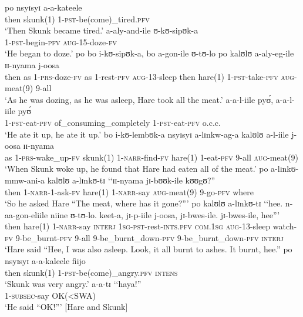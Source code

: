 \begin{exe}
	\ex\label{exHareSkunkEpisode3}
	\begin{xlist}
		\ex\gll po nsyɪsyɪ a-a-kateele\\
		then skunk(1) 1-\textsc{pst}-be(come)\_tired.\textsc{pfv}\\
		\glt `Then Skunk became tired.'
		\ex \gll a-aly-and-ile ʊ-kʊ-sipʊk-a\\
		1-\textsc{pst}-begin-\textsc{pfv} \textsc{aug}-15-doze-\textsc{fv}\\
		\glt `He began to doze.'
		\ex\gll po bo i-kʊ-sipʊk-a, bo a-gon-ile ʊ-tʊ-lo po kalʊlʊ a-aly-eg-ile ɪɪ-nyama j-oosa\\
		then as 1-\textsc{prs}-doze-\textsc{fv} as 1-rest-\textsc{pfv} \textsc{aug}-13-sleep then hare(1) 1-\textsc{pst}-take-\textsc{pfv} \textsc{aug}-meat(9) 9-all\\
		\glt `‎‎As he was dozing, as he was asleep, Hare took all the meat.'
		\ex\gll a-a-l-iile pyʊ́, a-a-l-iile pyʊ́\\
		1-\textsc{pst}-eat-\textsc{pfv} of\_consuming\_completely 1-\textsc{pst}-eat-\textsc{pfv} o.c.c.\\
		\glt `He ate it up, he ate it up.'
		\ex\gll bo i-kʊ-lembʊk-a nsyɪsyɪ a-lɪnkw-ag-a kalʊlʊ a-l-iile j-oosa ɪɪ-nyama\\
		as 1-\textsc{prs}-wake\_up-\textsc{fv} skunk(1) 1-\textsc{narr}-find-\textsc{fv} hare(1) 1-eat-\textsc{pfv} 9-all \textsc{aug}-meat(9)\\
		\glt `When Skunk woke up, he found that Hare had eaten all of the meat.'
		\ex\gll po a-lɪnkʊ-mmw-ani-a kalʊlʊ a-lɪnkʊ-tɪ \textup{\lq\lq}ɪɪ-nyama jɪ-bʊʊk-ile kʊʊgʊ?\textup{''}\\
		then 1-\textsc{narr}-1-ask-\textsc{fv} hare(1) 1-\textsc{narr}-say \phantom{\lq\lq}\textsc{aug}-meat(9) 9-go-\textsc{pfv} where\\
		\glt `So he asked Hare ``The meat, where has it gone?''{}'
		\ex\gll po kalʊlʊ a-lɪnkʊ-tɪ \textup{\lq\lq}hee. n-aa-gon-eliile niine ʊ-tʊ-lo. keet-a, jɪ-p-iile j-oosa, jɪ-bwes-ile. jɪ-bwes-ile, hee\textup{''}'\\
		then hare(1) 1-\textsc{narr}-say \phantom{\lq\lq}\textsc{interj} \textsc{1sg}-\textsc{pst}-rest-\textsc{ints.pfv} \textsc{com.1sg} \textsc{aug}-13-sleep watch-\textsc{fv} 9-be\_burnt-\textsc{pfv} 9-all 9-be\_burnt\_down-\textsc{pfv} 9-be\_burnt\_down-\textsc{pfv} \textsc{interj}\\
		\glt `Hare said ``Hee, I was also asleep. Look, it all burnt to ashes. It burnt, hee.''
		\ex\gll po nsyɪsyɪ a-a-kaleele fiijo\\
		then skunk(1) 1-\textsc{pst}-be(come)\_angry.\textsc{pfv} \textsc{intens}\\
		\glt `Skunk was very angry.' %
		\ex\gll a-a-tɪ \textup{\lq\lq}haya!\textup{''}\\
		1-\textsc{subsec}-say \phantom{\lq\lq}OK(<SWA)\\
		\glt `He said ``OK!''{}' [Hare and Skunk] 
	\end{xlist}
\end{exe}

